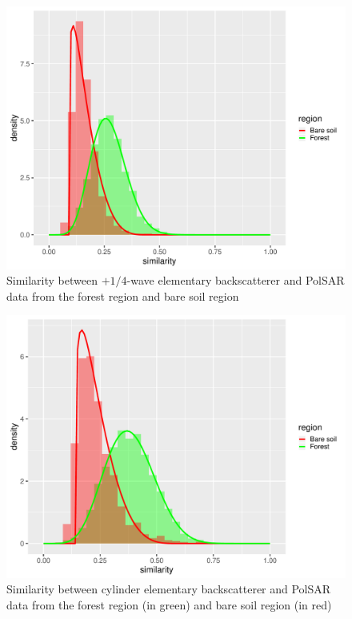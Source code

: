 \documentclass[conference]{IEEEtran}
\begin{document}
\begin{figure}[!ht]
    \vspace{.15\linewidth}
    \centering
    \includegraphics[width = .9\linewidth, height = .7\linewidth]{../../../Figures/paper_19_05/wvp.pdf}
    \caption{Similarity between $+1/4$-wave elementary backscatterer and PolSAR data from the forest region and bare soil region}
    \label{fig:wvp}
\end{figure}

\begin{figure}[!ht]
    \centering
    \includegraphics[width = .9\linewidth, height = .7\linewidth]{../../../Figures/paper_19_05/cy.pdf}
    \caption{Similarity between cylinder elementary backscatterer and PolSAR data from the forest region (in green) and bare soil region (in red)}
    \label{fig:cy}
\end{figure}
\end{document}
